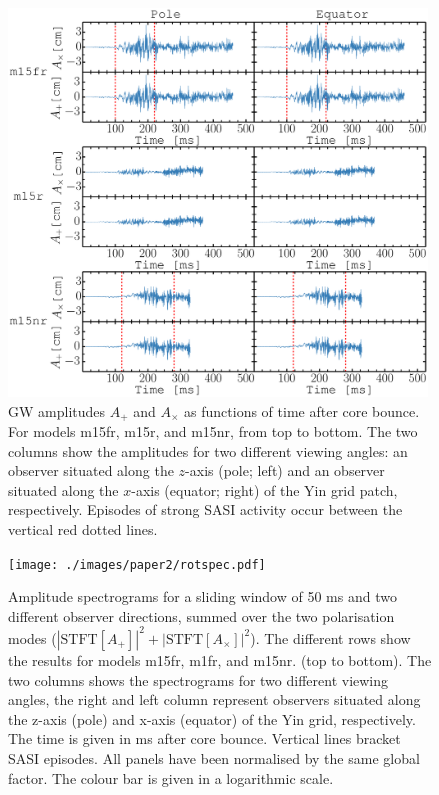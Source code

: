 \begin{figure}[h]
\centering                            
\includegraphics[width=0.99\textwidth]{./images/paper2/amps.pdf}
\caption{GW amplitudes $A_+$ and $A_\times$ as functions of time after core bounce.
  For models m15fr, m15r, and m15nr, from top to bottom. 
  The two columns show the amplitudes for two different viewing angles: an observer
  situated along the $z$-axis (pole; left) and an observer situated along the $x$-axis (equator; right) of the Yin grid patch, respectively.
  Episodes of strong SASI activity occur between the vertical red dotted lines.  \label{figp2:amps}}
\end{figure}
\begin{figure}
\centering                            
\texttt{[image: ./images/paper2/rotspec.pdf]}
\caption{Amplitude spectrograms for a sliding window of 50 ms and two different observer
  directions, summed over the two polarisation modes 
  ($|\text{STFT}[{A_+}]|^2 + |\text{STFT}[{A_{\times}}]|^2$). The
  different rows show the results for models m15fr, m1fr, and m15nr. (top to bottom).
  The two columns shows the spectrograms for two different viewing angles, the right and left column represent
  observers situated along the z-axis (pole) and x-axis (equator) of the Yin grid, respectively.
  The time is given in ms after core bounce. Vertical lines bracket SASI episodes. All panels have been normalised by the same global factor.
  The colour bar is given in a logarithmic scale. \label{figp2:spec}}
\end{figure}

